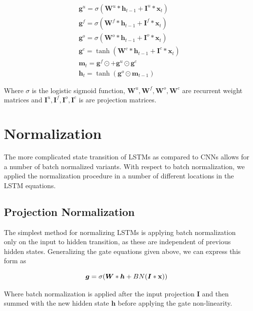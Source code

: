 \documentclass{article}
\def\x{{\mathbf x}}
\begin{document}
\begin{equation}
	\begin{split}
		& \boldsymbol g^u = \sigma(\boldsymbol W^u * \boldsymbol h_{t-1} + \boldsymbol I^u * \x_t) \\
		& \boldsymbol g^f = \sigma(\boldsymbol W^f * \boldsymbol h_{t-1} + \boldsymbol I^f * \x_t) \\
		& \boldsymbol g^o = \sigma(\boldsymbol W^o * \boldsymbol h_{t-1} + \boldsymbol I^o * \x_t) \\
		& \boldsymbol g^c = \tanh(\boldsymbol W^c * \boldsymbol h_{t-1} + \boldsymbol I^c * \x_t) \\
		& \boldsymbol m_t = \boldsymbol g^f \odot \boldsymbol +  \boldsymbol g^u \odot \boldsymbol g^c \\
		& \boldsymbol h_t = \tanh(\boldsymbol g^o \odot \boldsymbol m_{t-1}) \nonumber
	\end{split}
\end{equation}

Where $\sigma$ is the logistic sigmoid function, $\boldsymbol W^u, \boldsymbol W^f, \boldsymbol W^o, \boldsymbol W^c$ are recurrent weight matrices and $\boldsymbol I^u, \boldsymbol I^f, \boldsymbol I^o, \boldsymbol I^c$ is are projection matrices.

\section{Normalization}

The more complicated state transition of LSTMs as compared to CNNs allows for a number of batch normalized variants. With respect to batch normalization, we applied the normalization procedure in a number of different locations in the LSTM equations.

\subsection{Projection Normalization} The simplest method for normalizing LSTMs is applying batch normalization only on the input to hidden transition, as these are independent of previous hidden states. Generalizing the gate equations given above, we can express this form as

\begin{equation}
	\boldsymbol g = \sigma(\boldsymbol W * \boldsymbol h + BN(\boldsymbol I * \x)) \\
\end{equation}
 
Where batch normalization is applied after the input projection $\boldsymbol I$ and then summed with the new hidden state $\boldsymbol h$ before applying the gate non-linearity.
\end{document}
